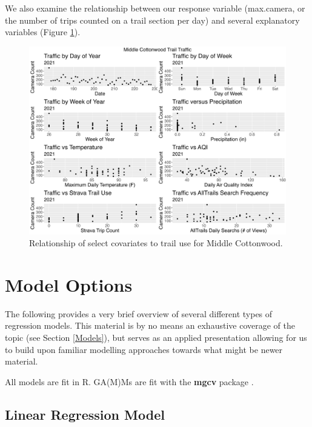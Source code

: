 \documentclass[
]{book}
\begin{document}
We also examine the relationship between our response variable (max.camera, or the number of trips counted on a trail section per day) and several explanatory variables (Figure \ref{fig:covariates}).

\begin{figure}

{\centering \includegraphics[width=1\linewidth]{../figures/MiddleCottonwood_Covariates} 

}

\caption{Relationship of select covariates to trail use for Middle Cottonwood.}\label{fig:covariates}
\end{figure}

\hypertarget{model-options}{%
\section{Model Options}\label{model-options}}

The following provides a very brief overview of several different types of regression models. This material is by no means an exhaustive coverage of the topic (see Section \ref{Models}), but serves as an applied presentation allowing for us to build upon familiar modelling approaches towards what might be newer material.

All models are fit in R. GA(M)Ms are fit with the \textbf{mgcv} package \citep[\citet{R-Wood2}, \citet{R-Wood3}, \citet{R-Wood4}, \citet{R-Wood5}]{R-Wood1}.

\hypertarget{linear-regression-model-1}{%
\subsection{Linear Regression Model}\label{linear-regression-model-1}}
\end{document}
